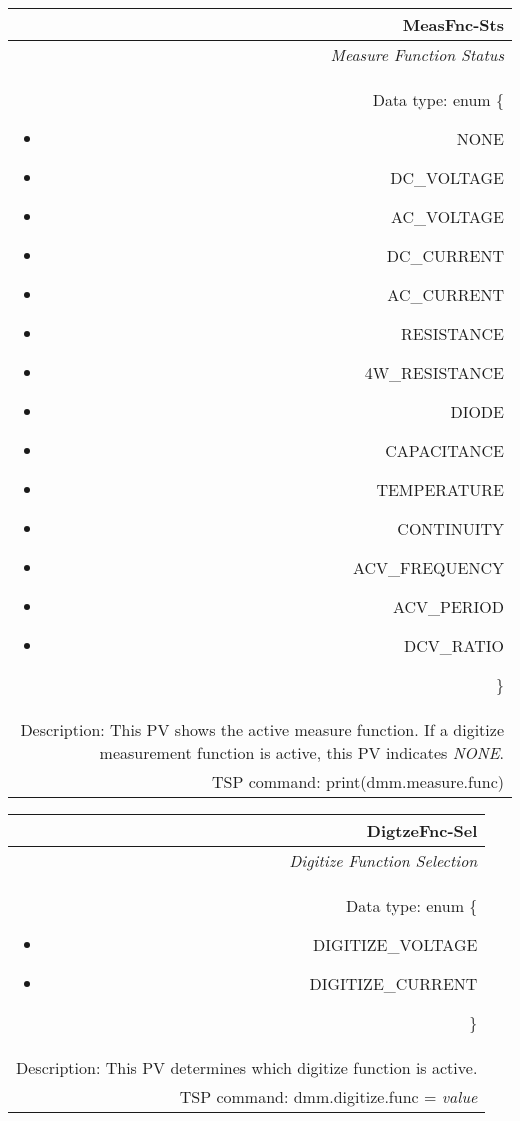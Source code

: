\documentclass[openany]{article}
\begin{document}
		\begin{tabular}{N}
			\hline
			\bfseries MeasFnc-Sts\label{pv:measfnc-sts} \\ \hline
			\emph{Measure Function Status} \\
			Data type: enum \{\begin{itemize}[noitemsep]
				\small
				\item[] NONE
				\item[] DC\_VOLTAGE
				\item[] AC\_VOLTAGE
				\item[] DC\_CURRENT
				\item[] AC\_CURRENT
				\item[] RESISTANCE
				\item[] 4W\_RESISTANCE
				\item[] DIODE
				\item[] CAPACITANCE
				\item[] TEMPERATURE
				\item[] CONTINUITY
				\item[] ACV\_FREQUENCY
				\item[] ACV\_PERIOD
				\item[] DCV\_RATIO
			\end{itemize}\} \\
			Description: This PV shows the active measure function. If a digitize measurement function is active, this PV indicates \emph{NONE}. \\
			TSP command: print(dmm.measure.func)
		\end{tabular}

		\begin{tabular}{N}
			\hline
			\bfseries DigtzeFnc-Sel\label{pv:digtzefnc-sel} \\ \hline
			\emph{Digitize Function Selection} \\
			Data type: enum \{\begin{itemize}[noitemsep]
				\small
				\item[] DIGITIZE\_VOLTAGE
				\item[] DIGITIZE\_CURRENT
			\end{itemize}\} \\
			Description: This PV determines which digitize function is active. \\
			TSP command: dmm.digitize.func = \emph{value}
		\end{tabular}
\end{document}
